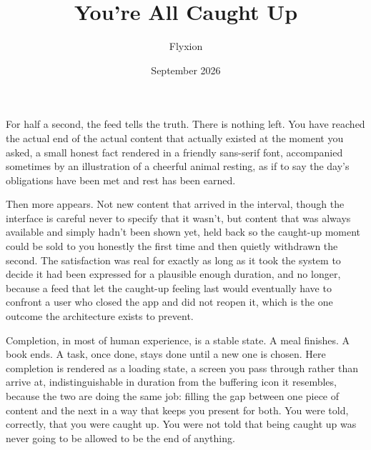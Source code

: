 \documentclass[11pt]{article}
\title{You're All Caught Up}
\author{Flyxion}
\date{September 2026}
\begin{document}
\maketitle

For half a second, the feed tells the truth. There is nothing left. You have reached the actual end of the actual content that actually existed at the moment you asked, a small honest fact rendered in a friendly sans-serif font, accompanied sometimes by an illustration of a cheerful animal resting, as if to say the day's obligations have been met and rest has been earned.

Then more appears. Not new content that arrived in the interval, though the interface is careful never to specify that it wasn't, but content that was always available and simply hadn't been shown yet, held back so the caught-up moment could be sold to you honestly the first time and then quietly withdrawn the second. The satisfaction was real for exactly as long as it took the system to decide it had been expressed for a plausible enough duration, and no longer, because a feed that let the caught-up feeling last would eventually have to confront a user who closed the app and did not reopen it, which is the one outcome the architecture exists to prevent.

Completion, in most of human experience, is a stable state. A meal finishes. A book ends. A task, once done, stays done until a new one is chosen. Here completion is rendered as a loading state, a screen you pass through rather than arrive at, indistinguishable in duration from the buffering icon it resembles, because the two are doing the same job: filling the gap between one piece of content and the next in a way that keeps you present for both. You were told, correctly, that you were caught up. You were not told that being caught up was never going to be allowed to be the end of anything.
\end{document}
